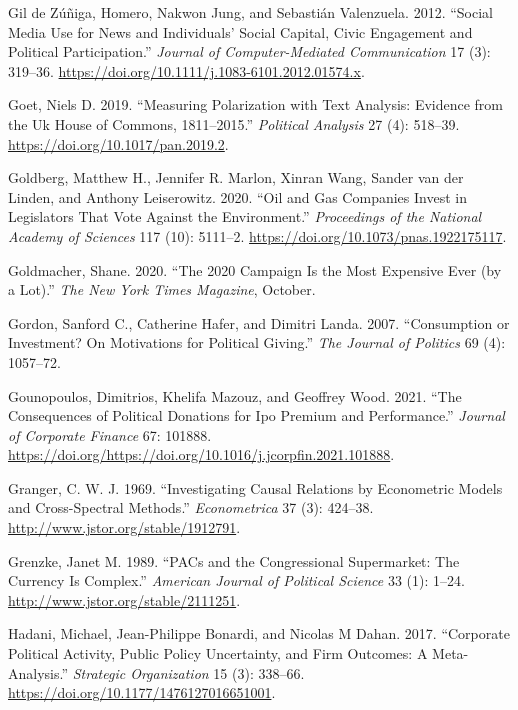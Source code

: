 \documentclass[12pt,]{article}
\begin{document}
\leavevmode\hypertarget{ref-zuniga2012}{}%
Gil de Zúñiga, Homero, Nakwon Jung, and Sebastián Valenzuela. 2012.
``Social Media Use for News and Individuals' Social Capital, Civic
Engagement and Political Participation.'' \emph{Journal of
Computer-Mediated Communication} 17 (3): 319--36.
\url{https://doi.org/10.1111/j.1083-6101.2012.01574.x}.

\leavevmode\hypertarget{ref-goet2019}{}%
Goet, Niels D. 2019. ``Measuring Polarization with Text Analysis:
Evidence from the Uk House of Commons, 1811--2015.'' \emph{Political
Analysis} 27 (4): 518--39. \url{https://doi.org/10.1017/pan.2019.2}.

\leavevmode\hypertarget{ref-goldberg2020}{}%
Goldberg, Matthew H., Jennifer R. Marlon, Xinran Wang, Sander van der
Linden, and Anthony Leiserowitz. 2020. ``Oil and Gas Companies Invest in
Legislators That Vote Against the Environment.'' \emph{Proceedings of
the National Academy of Sciences} 117 (10): 5111--2.
\url{https://doi.org/10.1073/pnas.1922175117}.

\leavevmode\hypertarget{ref-goldmacher2020}{}%
Goldmacher, Shane. 2020. ``The 2020 Campaign Is the Most Expensive Ever
(by a Lot).'' \emph{The New York Times Magazine}, October.

\leavevmode\hypertarget{ref-gordon2007}{}%
Gordon, Sanford C., Catherine Hafer, and Dimitri Landa. 2007.
``Consumption or Investment? On Motivations for Political Giving.''
\emph{The Journal of Politics} 69 (4): 1057--72.

\leavevmode\hypertarget{ref-gounopoulos2021}{}%
Gounopoulos, Dimitrios, Khelifa Mazouz, and Geoffrey Wood. 2021. ``The
Consequences of Political Donations for Ipo Premium and Performance.''
\emph{Journal of Corporate Finance} 67: 101888.
\url{https://doi.org/https://doi.org/10.1016/j.jcorpfin.2021.101888}.

\leavevmode\hypertarget{ref-granger}{}%
Granger, C. W. J. 1969. ``Investigating Causal Relations by Econometric
Models and Cross-Spectral Methods.'' \emph{Econometrica} 37 (3):
424--38. \url{http://www.jstor.org/stable/1912791}.

\leavevmode\hypertarget{ref-grenzke1989}{}%
Grenzke, Janet M. 1989. ``PACs and the Congressional Supermarket: The
Currency Is Complex.'' \emph{American Journal of Political Science} 33
(1): 1--24. \url{http://www.jstor.org/stable/2111251}.

\leavevmode\hypertarget{ref-hadani2017}{}%
Hadani, Michael, Jean-Philippe Bonardi, and Nicolas M Dahan. 2017.
``Corporate Political Activity, Public Policy Uncertainty, and Firm
Outcomes: A Meta-Analysis.'' \emph{Strategic Organization} 15 (3):
338--66. \url{https://doi.org/10.1177/1476127016651001}.
\end{document}
